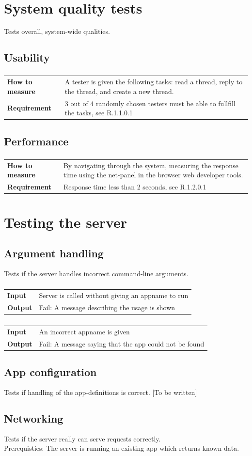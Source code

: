 \documentclass[a4paper, 12pt, titlepage]{article}
\newcommand{\urequirement}[2]{
	\subsubsection{}
	\begin{tabular}{l p{10cm}}
	\bf{How to measure} & 
		#1\\
	\bf{Requirement} & 
		#2\\
	\end{tabular}
}
\newcommand{\testcase}[2]{
	\subsubsection{}
	\begin{tabular}{l p{11cm}}
	\bf{Input} & 
		#1\\
	\bf{Output} & 
		#2\\
	\end{tabular}
}
\begin{document}
	\section{System quality tests}
	Tests overall, system-wide qualities.

	\subsection{Usability}
		\urequirement
		{
			A tester is given the following tasks: read a thread, reply to the thread, and create a new thread.
		}{
			3 out of 4 randomly chosen testers must be able to fullfill the tasks, see R.1.1.0.1
		}

	\subsection{Performance}
		\urequirement
		{
			By navigating through the system, measuring the response time using the net-panel in the browser web developer tools.
		}{
			Response time less than 2 seconds, see R.1.2.0.1
		}

	\section{Testing the server}
	\subsection{Argument handling}
	Tests if the server handles incorrect command-line arguments.\\

		\testcase
		{
			Server is called without giving an appname to run
		}{
			Fail: A message describing the usage is shown
		}

		\testcase
		{
			An incorrect appname is given
		}{
			Fail: A message saying that the app could not be found
		}

	\subsection{App configuration}
	Tests if handling of the app-definitions is correct. [To be written]\\


	\subsection{Networking}
	Tests if the server really can serve requests correctly.\\
	Prerequisties: The server is running an existing app which returns known data.
\end{document}
